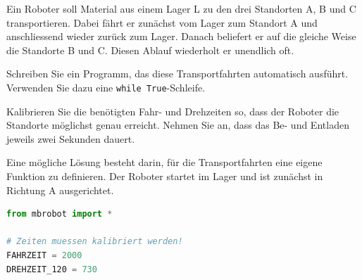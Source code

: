 \begin{myexercise}
    Ein Roboter soll Material aus einem Lager L zu den
    drei Standorten A, B und C transportieren. Dabei
    fährt er zunächst vom Lager zum Standort A und
    anschliessend wieder zurück zum Lager. Danach
    beliefert er auf die gleiche Weise die Standorte
    B und C. Diesen Ablauf wiederholt er unendlich oft.

    \begin{center}
    \end{center}

    Schreiben Sie ein Programm, das diese Transportfahrten
    automatisch ausführt. Verwenden Sie dazu eine
    \texttt{while True}-Schleife.

    Kalibrieren Sie die benötigten Fahr- und Drehzeiten
    so, dass der Roboter die Standorte möglichst genau
    erreicht. Nehmen Sie an, dass das Be- und Entladen
    jeweils zwei Sekunden dauert.

    \begin{myanswer}
        Eine mögliche Lösung besteht darin, für die
        Transportfahrten eine eigene Funktion zu definieren.
        Der Roboter startet im Lager und ist zunächst
        in Richtung A ausgerichtet.

        \begin{lstlisting}[language=Python]
from mbrobot import *

# Zeiten muessen kalibriert werden!
FAHRZEIT = 2000
DREHZEIT_120 = 730


\end{lstlisting}
\end{myanswer}
\end{myexercise}
